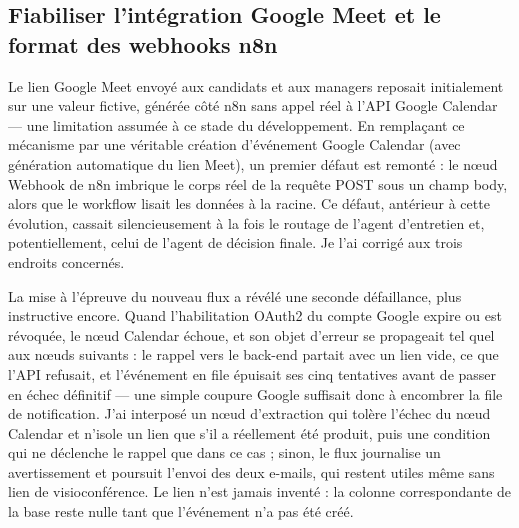 \subsection{Fiabiliser l’intégration Google Meet et le format des webhooks n8n}
\label{sec_4_5_10}
Le lien Google Meet envoyé aux candidats et aux managers reposait initialement sur une valeur fictive, générée côté n8n sans appel réel à l’API Google Calendar — une limitation assumée à ce stade du développement. En remplaçant ce mécanisme par une véritable création d’événement Google Calendar (avec génération automatique du lien Meet), un premier défaut est remonté : le nœud Webhook de n8n imbrique le corps réel de la requête POST sous un champ body, alors que le workflow lisait les données à la racine. Ce défaut, antérieur à cette évolution, cassait silencieusement à la fois le routage de l’agent d’entretien et, potentiellement, celui de l’agent de décision finale. Je l’ai corrigé aux trois endroits concernés.

La mise à l’épreuve du nouveau flux a révélé une seconde défaillance, plus instructive encore. Quand l’habilitation OAuth2 du compte Google expire ou est révoquée, le nœud Calendar échoue, et son objet d’erreur se propageait tel quel aux nœuds suivants : le rappel vers le back-end partait avec un lien vide, ce que l’API refusait, et l’événement en file épuisait ses cinq tentatives avant de passer en échec définitif — une simple coupure Google suffisait donc à encombrer la file de notification. J’ai interposé un nœud d’extraction qui tolère l’échec du nœud Calendar et n’isole un lien que s’il a réellement été produit, puis une condition qui ne déclenche le rappel que dans ce cas ; sinon, le flux journalise un avertissement et poursuit l’envoi des deux e-mails, qui restent utiles même sans lien de visioconférence. Le lien n’est jamais inventé : la colonne correspondante de la base reste nulle tant que l’événement n’a pas été créé.

